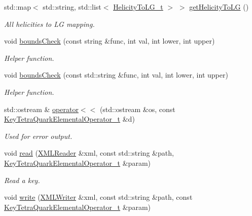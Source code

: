 \begin{DoxyCompactItemize}
std\+::map$<$ std\+::string, std\+::list$<$ \mbox{\hyperlink{structHadron_1_1HelicityToLG__t}{Helicity\+To\+L\+G\+\_\+t}} $>$ $>$ \mbox{\hyperlink{namespaceHadron_aeab17d669da3fa4a904236091bd5384f}{get\+Helicity\+To\+LG}} ()
\begin{DoxyCompactList}\small\item\em All helicities to LG mapping. \end{DoxyCompactList}\item 
void \mbox{\hyperlink{namespaceHadron_a73536a97ce9c6804192b72aceb86eb34}{bounds\+Check}} (const string \&func, int val, int lower, int upper)
\begin{DoxyCompactList}\small\item\em Helper function. \end{DoxyCompactList}\item 
void \mbox{\hyperlink{namespaceHadron_ae5bce98b9d65d71e6c4d4b63034ed0a1}{bounds\+Check}} (const std\+::string \&func, int val, int lower, int upper)
\begin{DoxyCompactList}\small\item\em Helper function. \end{DoxyCompactList}\item 
std\+::ostream \& \mbox{\hyperlink{namespaceHadron_a7065bb8b0e72a1c7d300230e08cdfdde}{operator$<$$<$}} (std\+::ostream \&os, const \mbox{\hyperlink{structHadron_1_1KeyTetraQuarkElementalOperator__t}{Key\+Tetra\+Quark\+Elemental\+Operator\+\_\+t}} \&d)
\begin{DoxyCompactList}\small\item\em Used for error output. \end{DoxyCompactList}\item 
void \mbox{\hyperlink{namespaceHadron_ab1a8a0ffcdeeae3ff66ed453c1609de7}{read}} (\mbox{\hyperlink{classADATXML_1_1XMLReader}{X\+M\+L\+Reader}} \&xml, const std\+::string \&path, \mbox{\hyperlink{structHadron_1_1KeyTetraQuarkElementalOperator__t}{Key\+Tetra\+Quark\+Elemental\+Operator\+\_\+t}} \&param)
\begin{DoxyCompactList}\small\item\em Read a key. \end{DoxyCompactList}\item 
void \mbox{\hyperlink{namespaceHadron_a4b91e53beed52be0c8431a4464285dfd}{write}} (\mbox{\hyperlink{classADATXML_1_1XMLWriter}{X\+M\+L\+Writer}} \&xml, const std\+::string \&path, const \mbox{\hyperlink{structHadron_1_1KeyTetraQuarkElementalOperator__t}{Key\+Tetra\+Quark\+Elemental\+Operator\+\_\+t}} \&param)

\end{DoxyCompactItemize}
